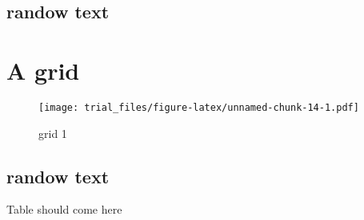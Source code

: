 \documentclass[]{article}
\begin{document}
\subsection{randow text}\label{randow-text-7}

\lipsum

\section{A grid}\label{a-grid-3}

\begin{figure}[htbp]
\centering
\texttt{[image: trial\_files/figure-latex/unnamed-chunk-14-1.pdf]}
\caption{grid 1}
\end{figure}

\subsection{randow text}\label{randow-text-8}

\lipsum

Table should come here
\end{document}

